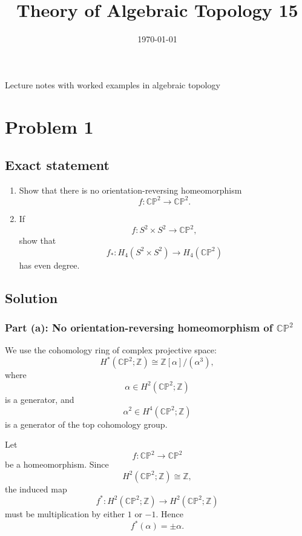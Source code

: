 \documentclass[12pt,a4paper]{article}
\title{\vspace{-1.5em}\bfseries Theory of Algebraic Topology 15}
\author{}
\date{\today}
\theoremstyle{notespace}
\begin{document}
	\maketitle
	\thispagestyle{plain}
		\begin{center}
		\begin{minipage}{0.92\textwidth}
			Lecture notes with worked examples in algebraic topology
		\end{minipage}
	\end{center}
		\tableofcontents
	\clearpage

\section{Problem 1}

\subsection*{Exact statement}

\begin{enumerate}
	\item[(a)] Show that there is no orientation-reversing homeomorphism
	\[
	f:\mathbb{CP}^{2}\longrightarrow \mathbb{CP}^{2}.
	\]
	
	\item[(b)] If
	\[
	f:S^{2}\times S^{2}\longrightarrow \mathbb{CP}^{2},
	\]
	show that
	\[
	f_{*}:H_{4}(S^{2}\times S^{2})\longrightarrow H_{4}(\mathbb{CP}^{2})
	\]
	has even degree.
\end{enumerate}

\subsection*{Solution}

\subsubsection*{Part (a): No orientation-reversing homeomorphism of \texorpdfstring{$\mathbb{CP}^{2}$}{CP2}}

We use the cohomology ring of complex projective space:
\[
H^{*}(\mathbb{CP}^{2};\mathbb{Z})
\cong
\mathbb{Z}[\alpha]/(\alpha^{3}),
\]
where
\[
\alpha\in H^{2}(\mathbb{CP}^{2};\mathbb{Z})
\]
is a generator, and
\[
\alpha^{2}\in H^{4}(\mathbb{CP}^{2};\mathbb{Z})
\]
is a generator of the top cohomology group.

Let
\[
f:\mathbb{CP}^{2}\longrightarrow \mathbb{CP}^{2}
\]
be a homeomorphism. Since
\[
H^{2}(\mathbb{CP}^{2};\mathbb{Z})\cong \mathbb{Z},
\]
the induced map
\[
f^{*}:H^{2}(\mathbb{CP}^{2};\mathbb{Z})
\longrightarrow
H^{2}(\mathbb{CP}^{2};\mathbb{Z})
\]
must be multiplication by either \(1\) or \(-1\). Hence
\[
f^{*}(\alpha)=\pm \alpha.
\]
\end{document}
